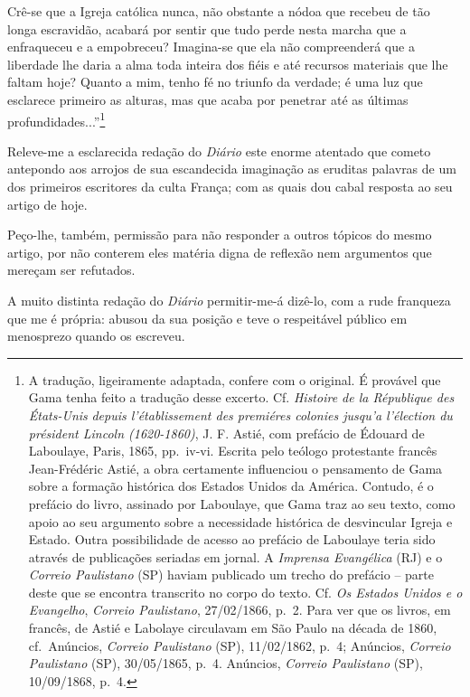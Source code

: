 Crê-se que a Igreja católica nunca, não obstante a nódoa que recebeu de
tão longa escravidão, acabará por sentir que tudo perde nesta marcha que
a enfraqueceu e a empobreceu? Imagina-se que ela não compreenderá que a
liberdade lhe daria a alma toda inteira dos fiéis e até recursos
materiais que lhe faltam hoje? Quanto a mim, tenho fé no triunfo da
verdade; é uma luz que esclarece primeiro as alturas, mas que acaba por
penetrar até as últimas profundidades...''\footnote{A tradução,
  ligeiramente adaptada, confere com o original. É provável que Gama
  tenha feito a tradução desse excerto. Cf. \emph{Histoire de la
  République des États-Unis} \emph{depuis l'établissement des premiéres
  colonies jusqu'a l'élection du président Lincoln (1620-1860)}, J. F.
  Astié, com prefácio de Édouard de Laboulaye, Paris, 1865, pp.~iv-vi.
  Escrita pelo teólogo protestante francês Jean-Frédéric Astié, a obra
  certamente influenciou o pensamento de Gama sobre a formação histórica
  dos Estados Unidos da América. Contudo, é o prefácio do livro,
  assinado por Laboulaye, que Gama traz ao seu texto, como apoio ao seu
  argumento sobre a necessidade histórica de desvincular Igreja e
  Estado. Outra possibilidade de acesso ao prefácio de Laboulaye teria
  sido através de publicações seriadas em jornal. A \emph{Imprensa
  Evangélica} (RJ) e o \emph{Correio Paulistano} (SP) haviam publicado
  um trecho do prefácio -- parte deste que se encontra transcrito no
  corpo do texto. Cf. \emph{Os Estados Unidos e o Evangelho},
  \emph{Correio Paulistano}, 27/02/1866, p.~2. Para ver que os livros,
  em francês, de Astié e Labolaye circulavam em São Paulo na década de
  1860, cf.~Anúncios, \emph{Correio Paulistano} (SP), 11/02/1862, p.~4;
  Anúncios, \emph{Correio Paulistano} (SP), 30/05/1865, p.~4. Anúncios,
  \emph{Correio Paulistano} (SP), 10/09/1868, p.~4.}

Releve-me a esclarecida redação do \emph{Diário} este enorme atentado
que cometo antepondo aos arrojos de sua escandecida imaginação as
eruditas palavras de um dos primeiros escritores da culta França; com as
quais dou cabal resposta ao seu artigo de hoje.

Peço-lhe, também, permissão para não responder a outros tópicos do mesmo
artigo, por não conterem eles matéria digna de reflexão nem argumentos
que mereçam ser refutados.

A muito distinta redação do \emph{Diário} permitir-me-á dizê-lo, com a
rude franqueza que me é própria: abusou da sua posição e teve o
respeitável público em menosprezo quando os escreveu.

